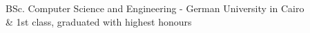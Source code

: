 %
%
%



\begin{scholarship}
        {
            BSc. Computer Science and Engineering - German University in Cairo \\ 
            & 1st class, graduated with highest honours
        }
\end{scholarship}